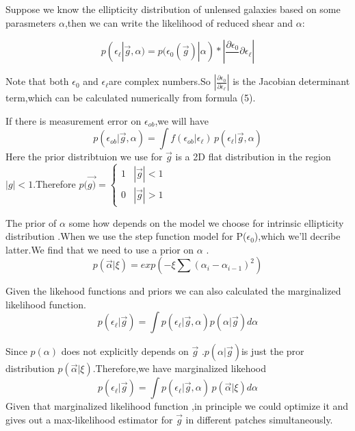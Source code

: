 \documentclass[useAMS,usenatbib]{mn2e}
\begin{document}
Suppose we know the ellipticity distribution of unlensed galaxies
based on some parasmeters $\alpha$,then we can write the likelihood
of reduced shear and $\alpha$:

\begin{equation}
p(\epsilon_{\ell}|\vec{g},\alpha)=p(\epsilon_{0}(\vec{g})|\alpha)*|\frac{\partial\epsilon_{0}}{\,}{\partial\epsilon_{\ell}}|
\end{equation}


Note that both $\epsilon_{0}$ and $\epsilon_{\ell}$are complex numbers.So
$|\frac{\partial\epsilon_{0}}{\partial\epsilon_{\ell}}|$ is the Jacobian
determinant term,which can be calculated numerically from formula
(5).

If there is measurement error on $\epsilon_{ob}$,we will have 
\begin{equation}
p(\epsilon_{ob}|\vec{g},\alpha)=\int f(\epsilon_{ob}|\epsilon_{\ell})\, p(\epsilon_{\ell}|\vec{g},\alpha)
\end{equation}
Here the prior distribtuion we use for $\vec{g}$ is a 2D flat distribution
in the region $|g|<1$.Therefore $p(\vec{g)}=\begin{cases}
1 & |\vec{g}|<1\\
0 & |\vec{g}|>1
\end{cases}$

The prior of $\alpha$ some how depends on the model we choose for
intrinsic ellipticity distribution .When we use the step function
model for P($\epsilon_{0}$),which we'll decribe latter.We find that
we need to use a prior on $\alpha$ . 
\begin{equation}
p(\vec{\alpha}|\xi)=exp(-\xi\sum(\alpha_{i}-\alpha_{i-1})^{2})
\end{equation}


Given the likehood functions and priors we can also calculated the
marginalized likelihood function. 
\begin{equation}
p(\epsilon_{\ell}|\vec{g})=\int p(\epsilon_{\ell}|\vec{g},\alpha)p(\alpha|\vec{g})d\alpha
\end{equation}


Since $p(\alpha)$ does not explicitly depends on $\vec{g}$ .$p(\alpha|\vec{g})$is
just the pror distribution $p(\vec{\alpha}|\xi)$.Therefore,we have
marginalized likehood 
\begin{equation}
p(\epsilon_{\ell}|\vec{g})=\int p(\epsilon_{\ell}|\vec{g},\alpha)\, p(\vec{\alpha}|\xi)d\alpha
\end{equation}
Given that marginalized likelihood function ,in principle we could
optimize it and gives out a max-likelihood estimator for $\vec{g}$
in different patches simultaneously.
\end{document}

